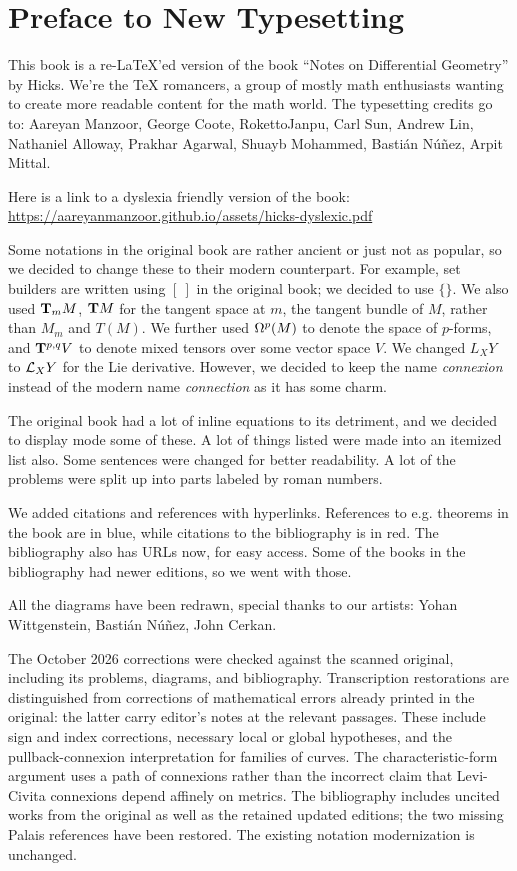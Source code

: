 \documentclass[main]{subfiles}
\begin{document}
\chapter*{Preface to New Typesetting}

This book is a re-LaTeX'ed version of the book ``Notes on Differential Geometry'' by Hicks. We're the \TeX
{}romancers, a group of mostly math enthusiasts wanting to create more readable content for the math world. The typesetting credits go to: Aareyan Manzoor, George Coote, RokettoJanpu, Carl Sun, Andrew Lin, Nathaniel Alloway, Prakhar Agarwal, Shuayb Mohammed, Bastián Núñez, Arpit Mittal. %

Here is a link to a dyslexia friendly version of the book: \url{https://aareyanmanzoor.github.io/assets/hicks-dyslexic.pdf}

Some notations in the original book are rather ancient or just not as popular, so we decided to change these to their modern counterpart. For example, set builders are written using $[~]$ in the original book; we decided to use $\{\}$. We also used $\tangentspace{M}{m}$, $\tangentbundle{M}$ for the tangent space at $m$, the tangent bundle of $M$, rather than $M_m$ and $T(M)$. We further used $\formbundle{M}{p}$ to denote the space of $p$-forms, and $\tensorbundle{}{p}{q}V$ to denote mixed tensors over some vector space $V$. We changed $L_XY$ to $\liederiv{X}Y$ for the Lie derivative. However, we decided to keep the name \emph{connexion} instead of the modern name \emph{connection} as it has some charm.

The original book had a lot of inline equations to its detriment, and we decided to display mode some of these. A lot of things listed were made into an itemized list also. Some sentences were changed for better readability. A lot of the problems were split up into parts labeled by roman numbers.

We added citations and references with hyperlinks. References to e.g. theorems in the book are in blue, while citations to the bibliography is in red. The bibliography also has URLs now, for easy access. Some of the books in the bibliography  had newer editions, so we went with those.

All the diagrams have been redrawn, special thanks to our artists: Yohan Wittgenstein, Bastián Núñez, John Cerkan. %

The October 2026 corrections were checked against the scanned original, including its problems, diagrams, and bibliography. Transcription restorations are distinguished from corrections of mathematical errors already printed in the original: the latter carry editor's notes at the relevant passages. These include sign and index corrections, necessary local or global hypotheses, and the pullback-connexion interpretation for families of curves. The characteristic-form argument uses a path of connexions rather than the incorrect claim that Levi-Civita connexions depend affinely on metrics. The bibliography includes uncited works from the original as well as the retained updated editions; the two missing Palais references have been restored. The existing notation modernization is unchanged.
\end{document}
